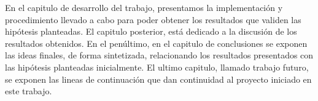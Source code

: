 \newpage

En el capitulo de desarrollo del trabajo, presentamos la implementación y procedimiento llevado a cabo para poder obtener los resultados que validen las hipótesis planteadas. El capitulo posterior, está dedicado a la discusión de los resultados obtenidos. En el penúltimo, en el capitulo de conclusiones se exponen las ideas finales, de forma sintetizada, relacionando los resultados presentados con las hipótesis planteadas inicialmente. El ultimo capitulo, llamado trabajo futuro, se exponen las lineas de continuación que dan continuidad al proyecto iniciado en este trabajo.

